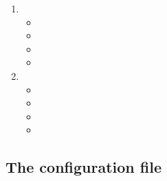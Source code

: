         \begin{enumerate}
            \item   {}
                \begin{itemize}
                \item {}
                \item {}
                \item {}
                \item {}
                \end{itemize}

            \item   {}
                \begin{itemize}
                \item {}
                \item {}
                \item {}
                \item {}
                \end{itemize}
        \end{enumerate}

\subsection{The configuration file} \label{sub:ConfigurationFile}



